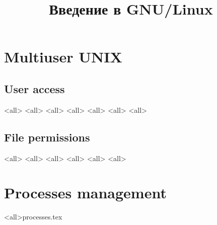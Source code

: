 

\title{Введение в GNU/Linux}





\begin{frame}
	\frametitle{}
	\titlepage
	\vspace{-0.5cm}
	\begin{center}
	\end{center}
\end{frame}



\section{Multiuser UNIX}
\subsection{User access}
\mode<all>{}
\mode<all>{}
\mode<all>{}
\mode<all>{}
\mode<all>{}
\mode<all>{}
\mode<all>{}
\subsection{File permissions}
\mode<all>{}
\mode<all>{}
\mode<all>{}
\mode<all>{}
\mode<all>{}
\mode<all>{}
\section{Processes management}
\mode<all>{{processes.tex}}
